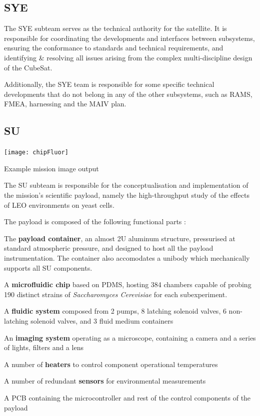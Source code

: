 \documentclass[a4paper,nobib]{tufte-book}
\begin{document}
\subsection{\acf{SYE}}

The \acl{SYE} subteam serves as the technical authority for the satellite. It is responsible for coordinating the developments and interfaces between subsystems, ensuring the conformance to standards and technical requirements, and identifying \& resolving all issues arising from the complex multi-discipline design of the CubeSat.

Additionally, the \ac{SYE} team is responsible for some specific technical developments that do not belong in any of the other subsystems, such as \ac{RAMS}, \ac{FMEA}, harnessing and the \acl{MAIV} plan.

\subsection{\acf{SU}}
\label{sec:su}
\begin{marginfigure}
	\texttt{[image: chipFluor]}
	\caption[Example mission image output]{Example mission image output \parencite{DDJF_PL}}
	\label{fig:chip_fluor}
\end{marginfigure}

The \acl{SU} subteam is responsible for the conceptualisation and implementation of the mission's scientific payload, namely the high-throughput study of the effects of \ac{LEO} environments on yeast cells.

The payload is composed of the following functional parts \autocite{DDJF_PL}:
\begin{compactitem}
	\item The \textbf{payload container}, an almost 2U aluminum structure, pressurised at standard atmospheric pressure, and designed to host all the payload instrumentation. The container also accomodates a unibody which mechanically supports all \ac{SU} components.
	\item A \textbf{microfluidic chip} based on \ac{PDMS}, hosting 384 chambers capable of probing 190 distinct strains of \emph{Saccharomyces Cerevisiae} for each subexperiment.
	\item A \textbf{fluidic system} composed from 2 pumps, 8 latching solenoid valves, 6 non-latching solenoid valves, and 3 fluid medium containers
	\item An \textbf{imaging system} operating as a microscope, containing a camera and a series of lights, filters and a lens
	\item A number of \textbf{heaters} to control component operational temperatures
	\item A number of redundant \textbf{sensors} for environmental measurements
	\item A \ac{PCB} containing the microcontroller and rest of the control components of the payload
\end{compactitem}
\end{document}
